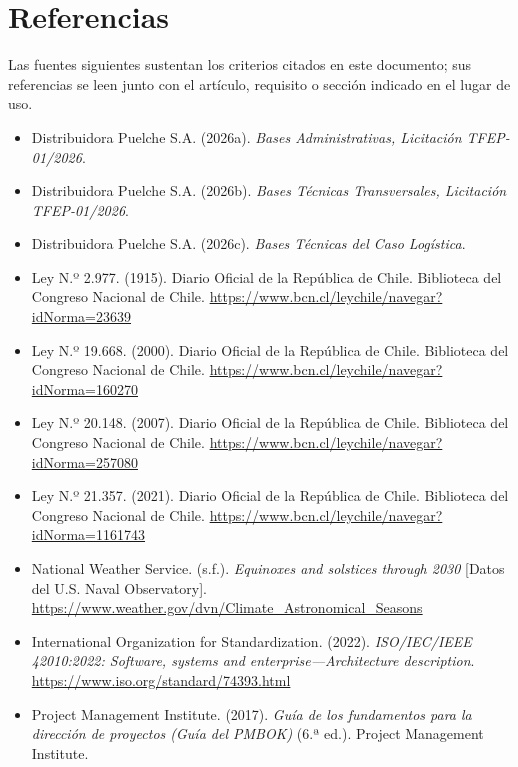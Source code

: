 \section*{Referencias}

Las fuentes siguientes sustentan los criterios citados en este documento; sus referencias se leen junto con el artículo, requisito o sección indicado en el lugar de uso.

\begin{itemize}[itemsep=0pt,parsep=0pt,topsep=2pt,before=\raggedright]
  \item Distribuidora Puelche S.A. (2026a). \emph{Bases Administrativas, Licitación TFEP-01/2026}.
  \item Distribuidora Puelche S.A. (2026b). \emph{Bases Técnicas Transversales, Licitación TFEP-01/2026}.
  \item Distribuidora Puelche S.A. (2026c). \emph{Bases Técnicas del Caso Logística}.
  \item Ley N.º 2.977. (1915). Diario Oficial de la República de Chile. Biblioteca del Congreso Nacional de Chile. \url{https://www.bcn.cl/leychile/navegar?idNorma=23639}
  \item Ley N.º 19.668. (2000). Diario Oficial de la República de Chile. Biblioteca del Congreso Nacional de Chile. \url{https://www.bcn.cl/leychile/navegar?idNorma=160270}
  \item Ley N.º 20.148. (2007). Diario Oficial de la República de Chile. Biblioteca del Congreso Nacional de Chile. \url{https://www.bcn.cl/leychile/navegar?idNorma=257080}
  \item Ley N.º 21.357. (2021). Diario Oficial de la República de Chile. Biblioteca del Congreso Nacional de Chile. \url{https://www.bcn.cl/leychile/navegar?idNorma=1161743}
  \item National Weather Service. (s.f.). \emph{Equinoxes and solstices through 2030} [Datos del U.S. Naval Observatory]. \url{https://www.weather.gov/dvn/Climate_Astronomical_Seasons}
  \item International Organization for Standardization. (2022). \emph{ISO/IEC/IEEE 42010:2022: Software, systems and enterprise—Architecture description}. \url{https://www.iso.org/standard/74393.html}
  \item Project Management Institute. (2017). \emph{Guía de los fundamentos para la dirección de proyectos (Guía del PMBOK)} (6.ª ed.). Project Management Institute.
\end{itemize}
